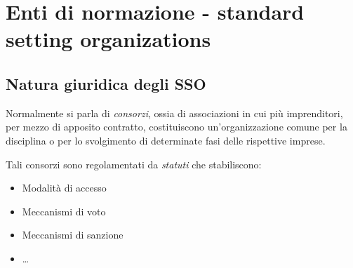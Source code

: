 \section{Enti di normazione - standard setting organizations}

\subsection{Natura giuridica degli SSO}
Normalmente si parla di \textit{consorzi}, ossia di associazioni in cui più imprenditori, per mezzo di apposito contratto, costituiscono un'organizzazione comune per la disciplina o per lo svolgimento di determinate fasi delle rispettive imprese.

Tali consorzi sono regolamentati da \textit{statuti} che stabiliscono:
\begin{itemize}
    \item Modalità di accesso
    \item Meccanismi di voto
    \item Meccanismi di sanzione
    \item \dots
\end{itemize}

